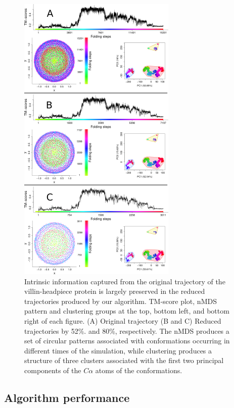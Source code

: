 \documentclass[american,twocolumn]{bmcart}
\begin{document}
\begin{figure}[!th]
\begin{raggedright}
\includegraphics{images/paths-intrinsic-info}
\par\end{raggedright}
\caption{ Intrinsic information captured from the original trajectory of the villin-headpiece protein is largely preserved in the reduced trajectories produced by our algorithm. TM-score plot, nMDS pattern and clustering groups at the top, bottom left, and bottom right of each figure. (A) Original trajectory (B and C) Reduced trajectories by 52\%. and 80\%, respectively. The nMDS produces a set of circular patterns associated with conformations occurring in different times of the simulation, while clustering produces a structure of three clusters associated with the first two principal components of the $C\alpha$ atoms of the conformations. \label{fig:Comparaciones-PCA-nMDS}}
\end{figure}


\subsection*{Algorithm performance}
\end{document}
